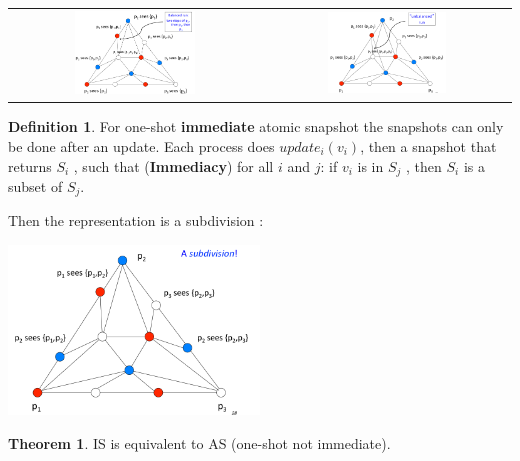 \documentclass{article}
\theoremstyle{definition}
\newtheorem{definition}{Definition}[section]
\newtheorem{theorem}{Theorem}
\begin{document}
\begin{center}
\begin{tabular}{c c}
\includegraphics[width=0.5\textwidth]{repres1} &
\includegraphics[width=0.5\textwidth]{repres2} 
\end{tabular}
\end{center}

\begin{definition}
For one-shot \textbf{immediate} atomic snapshot the snapshots can only be done after an update. Each process does $update_i(v_i )$, then a snapshot that returns $S_i$ , such that (\textbf{Immediacy}) for all $i$ and $j$: if $v_i$ is in $S_j$ , then $S_i$ is a subset of $S_j$.
\end{definition}

Then the representation is a subdivision : 
\begin{center}
\includegraphics[width=0.5\textwidth]{repres_is}\\
\end{center}

\begin{theorem}
IS is equivalent to AS (one-shot not immediate).
\end{theorem}
\end{document}
